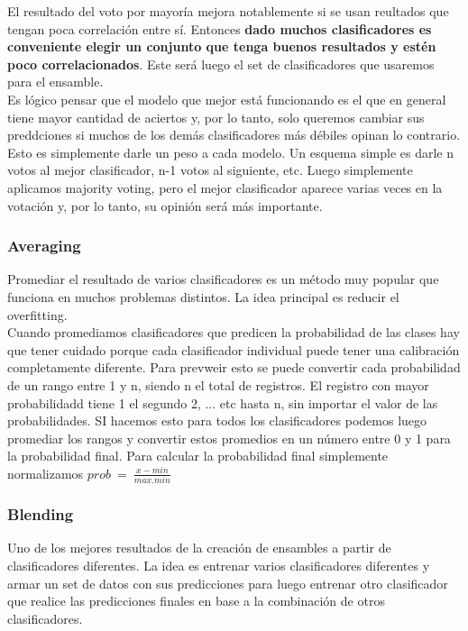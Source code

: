 \documentclass[titlepage,a4paper]{article}
\begin{document}
El resultado del voto por mayoría mejora notablemente si se usan reultados que tengan poca correlación entre sí.  Entonces \textbf{dado muchos clasificadores es conveniente elegir un conjunto que tenga buenos resultados y estén poco correlacionados}. Este será luego el set de clasificadores que usaremos para el ensamble. \\

Es lógico pensar que el modelo que mejor está funcionando es el que en general tiene mayor cantidad de aciertos y, por lo tanto, solo queremos cambiar sus preddciones si muchos de los demás clasificadores más débiles opinan lo contrario. Esto es simplemente darle un peso a cada modelo. Un esquema simple es darle n votos al mejor clasificador, n-1 votos al siguiente, etc. Luego simplemente aplicamos majority voting, pero el mejor clasificador aparece varias veces en la votación y, por lo tanto, su opinión será más importante. 


\subsubsection*{Averaging}
Promediar el resultado de varios clasificadores es un método muy popular que funciona en muchos problemas distintos. La idea principal es reducir el overfitting. \\

Cuando promediamos clasificadores que predicen la probabilidad de las clases hay que tener cuidado porque cada clasificador individual puede tener una calibración completamente diferente. Para  prevweir esto se puede convertir cada probabilidad de un rango entre 1 y n, siendo n el total de registros. El registro con mayor probabilidadd tiene 1 el segundo 2, ... etc hasta n, sin importar el valor de las probabilidades. SI hacemos esto para todos los clasificadores podemos luego promediar los rangos y convertir estos promedios en un número entre 0 y 1 para la probabilidad final. Para calcular la probabilidad final simplemente normalizamos $prob\ =\  \frac{x-min}{max.min}$

\subsubsection*{Blending}
Uno de los mejores resultados de la creación de ensambles a partir de clasificadores diferentes. La idea es entrenar varios clasificadores diferentes y armar un set de datos con sus predicciones para luego entrenar otro clasificador que realice las predicciones finales en base a la combinación de otros clasificadores. \\
\end{document}
